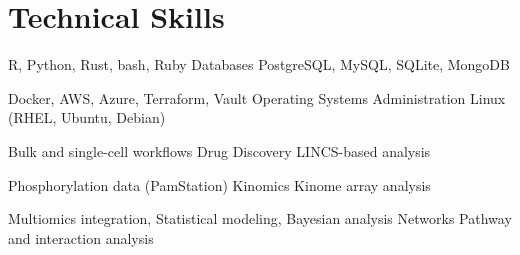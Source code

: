 \section{Technical Skills}

{R, Python, Rust, bash, Ruby}
{Databases}
{PostgreSQL, MySQL, SQLite, MongoDB}

{Docker, AWS, Azure, Terraform, Vault}
{Operating Systems Administration}
{Linux (RHEL, Ubuntu, Debian)}

{Bulk and single-cell workflows}
{Drug Discovery}
{LINCS-based analysis}

{Phosphorylation data (PamStation)}
{Kinomics}
{Kinome array analysis}

{Multiomics integration, Statistical modeling, Bayesian analysis}
{Networks}
{Pathway and interaction analysis}

